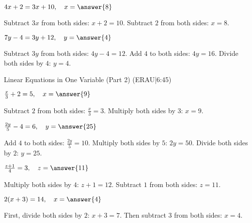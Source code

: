 \documentclass{ximera}
\begin{document}
\begin{problem}
$4x + 2 = 3x + 10,\quad x = \answer{8}$
\begin{feedback}
Subtract $3x$ from both sides: $x + 2 = 10$. Subtract $2$ from both sides: $x = 8$.
\end{feedback}
\end{problem}

\begin{problem}
$7y - 4 = 3y + 12,\quad y = \answer{4}$
\begin{feedback}
Subtract $3y$ from both sides: $4y - 4 = 12$. Add $4$ to both sides: $4y = 16$. Divide both sides by $4$: $y = 4$.
\end{feedback}
\end{problem}

Linear Equations in One Variable (Part 2) (ERAU|6:45)



\begin{problem}
$\frac{x}{3} + 2 = 5,\quad x = \answer{9}$
\begin{feedback}
Subtract $2$ from both sides: $\frac{x}{3} = 3$. Multiply both sides by $3$: $x = 9$.
\end{feedback}
\end{problem}

\begin{problem}
$\frac{2y}{5} - 4 = 6,\quad y = \answer{25}$
\begin{feedback}
Add $4$ to both sides: $\frac{2y}{5} = 10$. Multiply both sides by $5$: $2y = 50$. Divide both sides by $2$: $y = 25$.
\end{feedback}
\end{problem}

\begin{problem}
$\frac{z+1}{4} = 3,\quad z = \answer{11}$
\begin{feedback}
Multiply both sides by $4$: $z+1 = 12$. Subtract $1$ from both sides: $z = 11$.
\end{feedback}
\end{problem}



\begin{problem}
$2(x + 3) = 14,\quad x = \answer{4}$
\begin{feedback}
First, divide both sides by $2$: $x + 3 = 7$. Then subtract $3$ from both sides: $x = 4$.
\end{feedback}
\end{problem}
\end{document}

